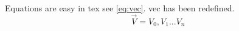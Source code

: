 Equations are easy in tex see \eqref{eq:vec}. vec has been redefined.
\begin{equation}
\label{eq:vec}
\vec{V} = {V_0,V_1...V_n} 
\end{equation}

